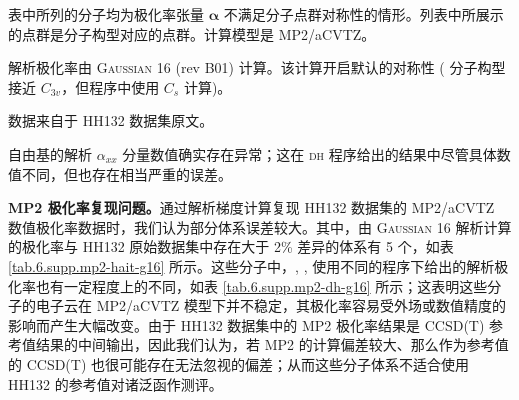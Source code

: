 \begin{table}[ht]
    \raggedright
    \par{} 表中所列的分子均为极化率张量 $\bm{\alpha}$ 不满足分子点群对称性的情形。列表中所展示的点群是分子构型对应的点群。计算模型是 MP2/aCVTZ。
    \par{} 解析极化率由 \textsc{Gaussian 16} (rev B01)\cite{Gaussian16} 计算。该计算开启默认的对称性 ( 分子构型接近 $C_{3v}$，但程序中使用 $C_s$ 计算)。
    \par{} 数据来自于 HH132 数据集原文\cite{Hait-Head-Gordon.PCCP.2018}。
    \par{}  自由基的解析 $\alpha_{xx}$ 分量数值确实存在异常；这在 \textsc{dh} 程序给出的结果中尽管具体数值不同，但也存在相当严重的误差。
\end{table}

\textbf{MP2 极化率复现问题。}通过解析梯度计算复现 HH132 数据集的 MP2/aCVTZ 数值极化率数据时，我们认为部分体系误差较大。其中，由 \textsc{Gaussian 16} 解析计算的极化率与 HH132 原始数据集中存在大于 2\% 差异的体系有 5 个，如表 \ref{tab.6.supp.mp2-hait-g16} 所示。这些分子中，, ,  使用不同的程序下给出的解析极化率也有一定程度上的不同，如表 \ref{tab.6.supp.mp2-dh-g16} 所示；这表明这些分子的电子云在 MP2/aCVTZ 模型下并不稳定，其极化率容易受外场或数值精度的影响而产生大幅改变。由于 HH132 数据集中的 MP2 极化率结果是 CCSD(T) 参考值结果的中间输出，因此我们认为，若 MP2 的计算偏差较大、那么作为参考值的 CCSD(T) 也很可能存在无法忽视的偏差；从而这些分子体系不适合使用 HH132 的参考值对诸泛函作测评。


